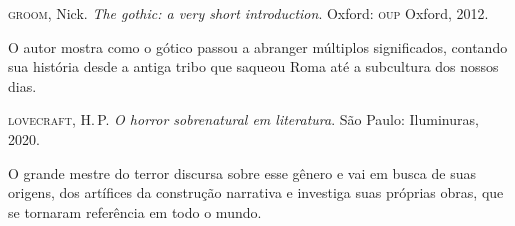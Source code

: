 \documentclass[12pt]{extarticle}
\begin{document}
\textsc{groom}, Nick. \textit{The gothic: a very short introduction}. Oxford: \textsc{oup} Oxford, 2012.

O autor mostra como o gótico passou a abranger múltiplos significados,
contando sua história desde a antiga tribo que saqueou Roma até a
subcultura dos nossos dias.

\textsc{lovecraft}, H.\,P. \textit{O horror sobrenatural em literatura}. São Paulo: Iluminuras, 2020.

O grande mestre do terror discursa sobre esse gênero e vai em busca de
suas origens, dos artífices da construção narrativa e investiga suas
próprias obras, que se tornaram referência em todo o mundo.
\end{document}
